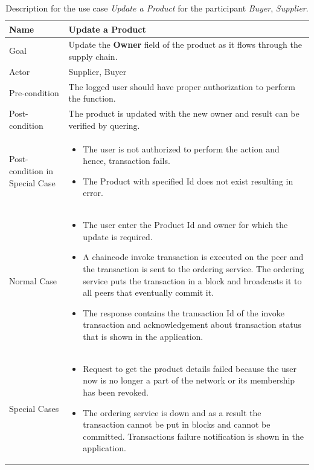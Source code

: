 \documentclass[
  a4paper,  %
  twoside,  %
  bibliography=totoc,
  headsepline,
  cleardoublepage=empty,
  parskip=half,
  draft=false
]{scrbook}
\begin{document}
\begin{table}[t!]
\begin{center}
    \begin{tabular}{ | l | p{9cm} |}
    \hline
    \textbf{Name} & \textbf{Update a Product} \\ \hline
    Goal & Update the \textbf{Owner} field of the product as it flows through the supply chain. \\ \hline
    Actor & Supplier, Buyer \\ \hline
    Pre-condition & The logged user should have proper authorization to perform the function. \\ \hline
    Post-condition & The product is updated with the new owner and result can be verified by quering. \\ \hline
    Post-condition in Special Case & \begin{itemize}
        \item The user is not authorized to perform the action and hence, transaction fails.
        \item The Product with specified Id does not exist resulting in error.
    \end{itemize}\\ \hline
    Normal Case & \begin{itemize}
        \item The user enter the Product Id and owner for which the update is required.
        \item A chaincode invoke transaction is executed on the peer and the transaction is sent to the ordering service. The ordering service puts the transaction in a block and broadcasts it to all peers that eventually commit it.
        \item The response contains the transaction Id of the invoke transaction and acknowledgement about transaction status that is shown in the application.
    \end{itemize}\\ \hline
    Special Cases & \begin{itemize}
        \item Request to get the product details failed because the user now is no longer a part of the network or its membership has been revoked.
        \item The ordering service is down and as a result the transaction cannot be put in blocks and cannot be committed. Transactions failure notification is shown in the application.
    \end{itemize}\\ \hline
    \end{tabular}
\end{center}
\caption{Description for the use case \textit{Update a Product} for the participant \textit{Buyer}, \textit{Supplier}.}
    \label{tab:uc4}
\end{table}
\clearpage
\end{document}
